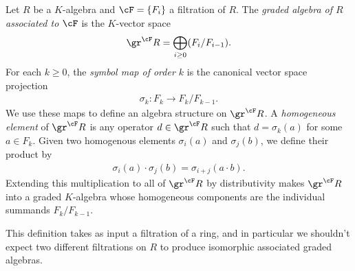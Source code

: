 \begin{defn}\label{defn:associated-grading-rng}
	Let $R$ be a $K$-algebra and $\cF = \{F_i\}$ a filtration of $R$. The \emph{graded algebra of $R$ associated to $\cF$} is the $K$-vector space
	\begin{align*}
		\gr^\cF R = \bigoplus_{i\geq 0}(F_i/F_{i-1}).
	\end{align*}
	For each $k \geq 0$, the \emph{symbol map of order $k$} is the canonical vector space projection
	\begin{align*}
		\sigma_k:F_k\to F_k/F_{k-1}.
	\end{align*}
	We use these maps to define an algebra structure on $\gr^\cF R$. A \emph{homogeneous element} of $\gr^\cF R$ is any operator $d \in \gr^\cF R$ such that $d = \sigma_k(a)$ for some $a \in F_k$. Given two homogenous elements $\sigma_i(a)$ and $\sigma_j(b)$, we define their product by
	\begin{align*}
		\sigma_i(a)\cdot \sigma_j(b) = \sigma_{i+j}(a\cdot b).
	\end{align*}
	Extending this multiplication to all of $\gr^\cF R$ by distributivity makes $\gr^\cF R$ into a graded $K$-algebra whose homogeneous components are the individual summands $F_k/F_{k-1}$.
\end{defn}
This definition takes as input a filtration of a ring, and in particular we shouldn't expect two different filtrations on $R$ to produce isomorphic associated graded algebras.

